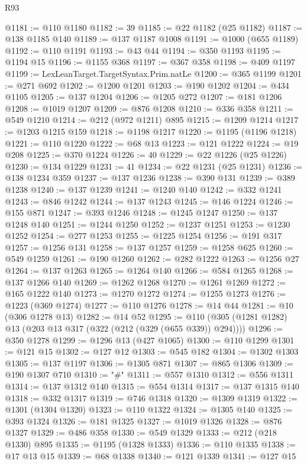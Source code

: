 \begin{lexlean}{R93}
\begin{coremodule}
@1181 := @110 @1180
@1182 := 39
@1185 := @22 @1182 (@25 @1182)
@1187 := @138 @1185 @140
@1189 := @137 @1187 @1008
@1191 := @1000 (@655 @1189)
@1192 := @110 @1191
@1193 := @43 @44
@1194 := @350 @1193
@1195 := @1194 @15
@1196 := @1155 @368
@1197 := @367 @358
@1198 := @409 @1197
@1199 := LexLeanTarget.TargetSyntax.Prim.natLe
@1200 := @365 @1199
@1201 := @271 @692
@1202 := @1200 @1201
@1203 := @190 @1202
@1204 := @434 @1105
@1205 := @137 @1204
@1206 := @1205 @272
@1207 := @181 @1206
@1208 := @1019 @1207
@1209 := @876 @1208
@1210 := @336 @358
@1211 := @549 @1210
@1214 := @212 (@972 @1211) @895
@1215 := @1209 @1214
@1217 := @1203 @1215 @159
@1218 := @1198 @1217
@1220 := @1195 (@1196 @1218)
@1221 := @110 @1220
@1222 := @68 @13
@1223 := @121 @1222
@1224 := @19 @208
@1225 := @370 @1224
@1226 := 40
@1229 := @22 @1226 (@25 @1226)
@1230 := @134 @1229
@1231 := 41
@1234 := @22 @1231 (@25 @1231)
@1236 := @138 @1234 @359
@1237 := @137 @1236
@1238 := @390 @131
@1239 := @389 @1238
@1240 := @137 @1239
@1241 := @1240 @140
@1242 := @332 @1241
@1243 := @846 @1242
@1244 := @137 @1243
@1245 := @146 @1224
@1246 := @155 @871
@1247 := @393 @1246
@1248 := @1245 @1247
@1250 := @137 @1248 @140
@1251 := @1244 @1250
@1252 := @1237 @1251
@1253 := @1230 @1252
@1254 := @277 @1253
@1255 := @1225 @1254
@1256 := @191 @317
@1257 := @1256 @131
@1258 := @137 @1257
@1259 := @1258 @625
@1260 := @549 @1259
@1261 := @190 @1260
@1262 := @282 @1222
@1263 := @1256 @27
@1264 := @137 @1263
@1265 := @1264 @140
@1266 := @584 @1265
@1268 := @137 @1266 @140
@1269 := @1262 @1268
@1270 := @1261 @1269
@1272 := @165 @1222 @140
@1273 := @1270 @1272
@1274 := @1255 @1273
@1276 := @1223 (@369 @1274)
@1277 := @110 @1276
@1278 := @14 @44
@1281 := @10 (@306 @1278 @13)
@1282 := @14 @52
@1295 := @110 (@305 (@1281 @1282) @13 (@203 @13 @317 (@322 (@212 (@329 (@655 @339)) @294))))
@1296 := @350 @1278
@1299 := @1296 @13 (@427 @1065)
@1300 := @110 @1299
@1301 := @121 @15
@1302 := @127 @12
@1303 := @545 @182
@1304 := @1302 @1303
@1305 := @137 @1197
@1306 := @1305 @871
@1307 := @865 @1306
@1309 := @190 @1307 @710
@1310 := "#"
@1311 := @557 @1310
@1312 := @556 @1311
@1314 := @137 @1312 @140
@1315 := @554 @1314
@1317 := @137 @1315 @140
@1318 := @332 @1317
@1319 := @746 @1318
@1320 := @1309 @1319
@1322 := @1301 (@1304 @1320)
@1323 := @110 @1322
@1324 := @1305 @140
@1325 := @393 @1324
@1326 := @181 @1325
@1327 := @1019 @1326
@1328 := @876 @1327
@1329 := @486 @358
@1330 := @549 @1329
@1333 := @212 (@218 @1330) @895
@1335 := @1195 (@1328 @1333)
@1336 := @110 @1335
@1338 := @17 @13 @15
@1339 := @68 @1338
@1340 := @121 @1339
@1341 := @127 @15

\end{coremodule}
\end{lexlean}
